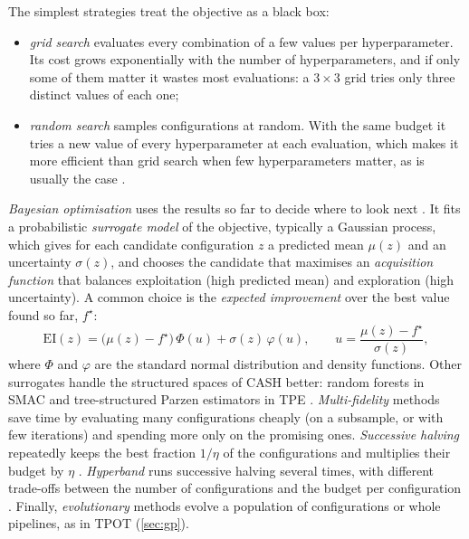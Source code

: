 The simplest strategies treat the objective as a black box:
\begin{itemize}
  \item \emph{grid search} evaluates every combination of a few values per hyperparameter. Its cost
        grows exponentially with the number of hyperparameters, and if only some of them matter it
        wastes most evaluations: a $3\times3$ grid tries only three distinct values of each one;
  \item \emph{random search} samples configurations at random. With the same budget it tries a new
        value of every hyperparameter at each evaluation, which makes it more efficient than grid
        search when few hyperparameters matter, as is usually the case \citep{bergstra2012random}.
\end{itemize}
\emph{Bayesian optimisation} uses the results so far to decide where to look next
\citep{jones1998efficient,snoek2012practical}. It fits a probabilistic \emph{surrogate model} of the
objective, typically a Gaussian process, which gives for each candidate configuration $z$ a predicted
mean $\mu(z)$ and an uncertainty $\sigma(z)$, and chooses the candidate that maximises an
\emph{acquisition function} that balances exploitation (high predicted mean) and exploration (high
uncertainty). A common choice is the \emph{expected improvement} over the best value found so far,
$f^\star$:
\begin{equation}\label{eq:ei}
  \mathrm{EI}(z)=\bigl(\mu(z)-f^\star\bigr)\,\Phi(u)+\sigma(z)\,\varphi(u),\qquad
  u=\frac{\mu(z)-f^\star}{\sigma(z)},
\end{equation}
where $\Phi$ and $\varphi$ are the standard normal distribution and density functions. Other surrogates
handle the structured spaces of CASH better: random forests in SMAC \citep{hutter2011sequential} and
tree-structured Parzen estimators in TPE \citep{bergstra2011algorithms}. \emph{Multi-fidelity} methods
save time by evaluating many configurations cheaply (on a subsample, or with few iterations) and
spending more only on the promising ones. \emph{Successive halving} repeatedly keeps the best fraction
$1/\eta$ of the configurations and multiplies their budget by $\eta$ \citep{jamieson2016non}. \emph{Hyperband} runs successive halving several times, with different trade-offs between the number of configurations and the budget
per configuration \citep{li2018hyperband}. Finally, \emph{evolutionary} methods evolve a population of
configurations or whole pipelines, as in TPOT (\cref{sec:gp}).

